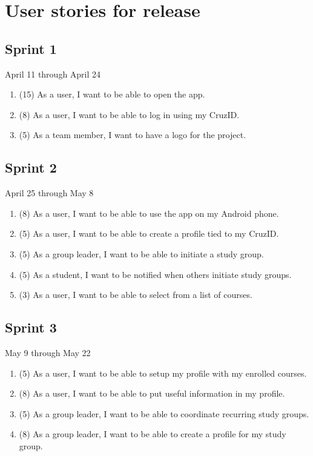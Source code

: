 \documentclass[10pt]{article}
\begin{document}
    \section{User stories for release}

    \subsection{Sprint 1}
    April 11 through April 24
    \begin{enumerate}
        \item (15) As a user, I want to be able to open the app.
        \item (8) As a user, I want to be able to log in using my CruzID.
        \item (5) As a team member, I want to have a logo for the project.
    \end{enumerate}

    \subsection{Sprint 2}
    April 25 through May 8
    \begin{enumerate}
        \item (8) As a user, I want to be able to use the app on my Android phone.
        \item (5) As a user, I want to be able to create a profile tied to my CruzID.
        \item (5) As a group leader, I want to be able to initiate a study group.
        \item (5) As a student, I want to be notified when others initiate study groups.
        \item (3) As a user, I want to be able to select from a list of courses.
    \end{enumerate}
    
    \subsection{Sprint 3}
    May 9 through May 22
    \begin{enumerate}
        \item (5) As a user, I want to be able to setup my profile with my enrolled courses.
        \item (8) As a user, I want to be able to put useful information in my profile.
        \item (5) As a group leader, I want to be able to coordinate recurring study groups.
        \item (8) As a group leader, I want to be able to create a profile for my study group.
    \end{enumerate}
\end{document}
